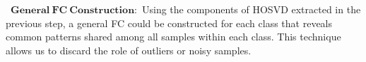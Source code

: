 \documentclass[preprint,12pt]{elsarticle}
\begin{document}
	\textbullet\ $\mathbf{General~FC~Construction:}$
	Using the components of HOSVD extracted in the previous step, a general FC could be constructed for each class that reveals common patterns shared among all samples within each class. This technique allows us to discard the role of outliers or noisy samples.   
	
\end{document}
